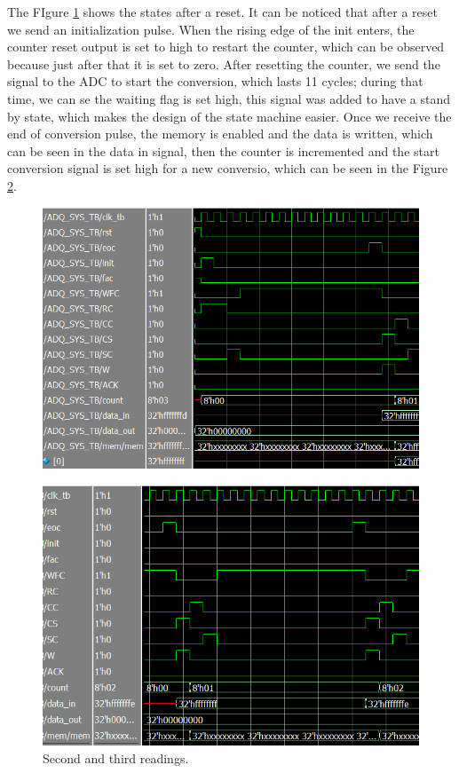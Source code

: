 \documentclass[conference]{IEEEtran}
\begin{document}
	The FIgure \ref{fig:first-reset-state} shows the states after a reset. It can be noticed that after a reset we send an initialization pulse. When the rising edge of the init enters, the counter reset output is set to high to restart the counter, which can be observed because just after that it is set to zero. After resetting the counter, we send the signal to the ADC to start the conversion, which lasts 11 cycles; during that time, we can se the waiting flag is set high, this signal was added to have a stand by state, which makes the design of the state machine easier. Once we receive the end of conversion pulse, the memory is enabled and the data is written, which can be seen in the data in signal, then the counter is incremented and the start conversion signal is set high for a new conversio, which can be seen in the Figure \ref{fig:second-saved-data}.
	\begin{figure}[H]
		\centering
		\includegraphics[width=\columnwidth]{"Files/First reset state"}
		\caption{}
		\label{fig:first-reset-state}
	\end{figure}

	
	\begin{figure}[H]
		\centering
		\includegraphics[width=\columnwidth]{"Files/second saved data"}
		\caption{Second and third readings.}
		\label{fig:second-saved-data}
	\end{figure}
	
\end{document}
